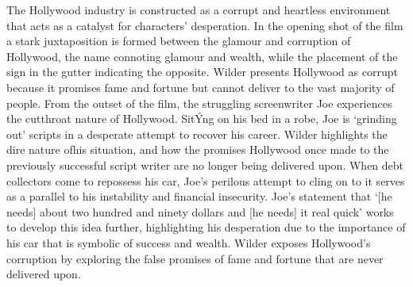 \documentclass[a4paper]{article}
\begin{document}
The Hollywood industry is constructed as a corrupt and heartless environment that acts as a catalyst for characters’ desperation. In the opening shot of the film a stark juxtaposition is formed between the glamour and corruption of Hollywood, the name connoting glamour and wealth, while the placement of the sign in the gutter indicating the opposite. Wilder presents Hollywood as corrupt because it promises fame and fortune but cannot deliver to the vast majority of people. From the outset of the film, the struggling screenwriter Joe experiences the cutthroat nature of Hollywood. SitÝng on his bed in a robe, Joe is ‘grinding out’ scripts in a desperate attempt to recover his career. Wilder highlights the dire nature ofhis situation, and how the promises Hollywood once made to the previously successful script writer are no longer being delivered upon. When debt collectors come to repossess his car, Joe’s perilous attempt to cling on to it serves as a parallel to his instability and financial insecurity. Joe's statement that ‘[he needs] about two hundred and ninety dollars and [he needs] it real quick’ works to develop this idea further, highlighting his desperation due to the importance of his car that is symbolic of success and wealth. Wilder exposes Hollywood’s corruption by exploring the false promises of fame and fortune that are never delivered upon.\\
\end{document}
